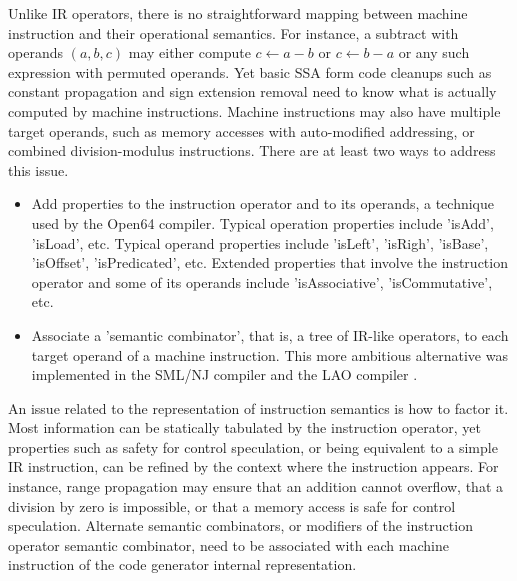 Unlike IR operators, there is no straightforward mapping between machine
instruction and their operational semantics. For instance, a subtract
with operands $(a,b,c)$ may either compute $c \leftarrow a-b$ or $c
\leftarrow b-a$ or any such expression with permuted operands. Yet basic SSA
form code cleanups such as constant propagation and sign extension removal need
to know what is actually computed by machine instructions.  Machine instructions
may also have multiple target operands, such as memory accesses with
auto-modified addressing, or combined division-modulus instructions.
There are at least two ways to address this issue. \begin{itemize}
\item Add properties to the instruction operator and to its operands, a
technique used by the Open64 compiler. Typical operation properties include
'isAdd', 'isLoad', etc. Typical operand properties include 'isLeft', 'isRigh',
'isBase', 'isOffset', 'isPredicated', etc. Extended properties that involve the
instruction operator and some of its operands include 'isAssociative',
'isCommutative', etc.
\item Associate a 'semantic combinator', that is, a tree of IR-like operators,
to each target operand of a machine instruction. This more ambitious alternative
was implemented in the SML/NJ \cite{Leung:1999:PLDI} compiler and the LAO
compiler \cite{Dinechin:2000:CASES}.  \end{itemize}

An issue related to the representation of instruction semantics is how to factor
it. Most information can be statically tabulated by the instruction operator,
yet properties such as safety for control speculation, or being equivalent to a
simple IR instruction, can be refined by the context where the instruction
appears. For instance, range propagation may ensure that an addition cannot
overflow, that a division by zero is impossible, or that a memory access is safe
for control speculation.  Alternate semantic combinators, or modifiers of the
instruction operator semantic combinator, need to be associated with each
machine instruction of the code generator internal representation.

